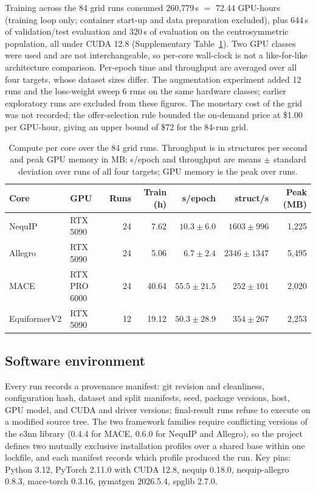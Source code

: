Training across the 84 grid runs consumed 260,779\,s $=$ 72.44 GPU-hours (training loop only; container start-up and data preparation excluded), plus 644\,s of validation/test evaluation and 320\,s of evaluation on the centrosymmetric population, all under CUDA 12.8 (Supplementary Table~\ref{stab:compute}). Two GPU classes were used and are not interchangeable, so per-core wall-clock is not a like-for-like architecture comparison. Per-epoch time and throughput are averaged over all four targets, whose dataset sizes differ. The augmentation experiment added 12 runs and the loss-weight sweep 6 runs on the same hardware classes; earlier exploratory runs are excluded from these figures. The monetary cost of the grid was not recorded; the offer-selection rule bounded the on-demand price at \$1.00 per GPU-hour, giving an upper bound of \$72 for the 84-run grid.

\begin{table}[htbp]
\centering
\caption{Compute per core over the 84 grid runs. Throughput is in structures per second and peak GPU memory in MB; s/epoch and throughput are means $\pm$ standard deviation over runs of all four targets; GPU memory is the peak over runs.}
\label{stab:compute}
\fontsize{7bp}{8.5bp}\selectfont
\begin{tabular}{llrrrrr}
\toprule
Core & GPU & Runs & Train (h) & s/epoch & struct/s & Peak (MB) \\
\midrule
NequIP & RTX 5090 & 24 & 7.62 & $10.3 \pm 6.0$ & $1603 \pm 996$ & 1{,}225 \\
Allegro & RTX 5090 & 24 & 5.06 & $6.7 \pm 2.4$ & $2346 \pm 1347$ & 5{,}495 \\
MACE & RTX PRO 6000 & 24 & 40.64 & $55.5 \pm 21.5$ & $252 \pm 101$ & 2{,}020 \\
EquiformerV2 & RTX 5090 & 12 & 19.12 & $50.3 \pm 28.9$ & $354 \pm 267$ & 2{,}253 \\
\bottomrule
\end{tabular}

\end{table}

\subsection*{Software environment}

Every run records a provenance manifest: git revision and cleanliness, configuration hash, dataset and split manifests, seed, package versions, host, GPU model, and CUDA and driver versions; final-result runs refuse to execute on a modified source tree. The two framework families require conflicting versions of the e3nn library\cite{geiger2022e3nn} (0.4.4 for MACE, 0.6.0 for NequIP and Allegro), so the project defines two mutually exclusive installation profiles over a shared base within one lockfile, and each manifest records which profile produced the run. Key pins: Python 3.12, PyTorch\cite{paszke2019pytorch} 2.11.0 with CUDA 12.8, nequip 0.18.0, nequip-allegro 0.8.3, mace-torch 0.3.16, pymatgen 2026.5.4, spglib 2.7.0.

